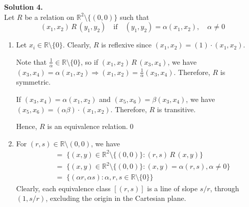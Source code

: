\documentclass[10pt]{article}
\begin{document}
        \textbf{Solution 4.}\\
        Let $R$ be a relation on $\mathbb{R}^2\setminus\{(0,0)\}$ such that
        \[(x_1, x_2)\,R\,(y_1, y_2) \quad\text{if}\quad (y_1, y_2) = \alpha(x_1, x_2), \quad\alpha\neq 0\]
        \begin{enumerate}
                \item Let $x_i \in \mathbb{R}\setminus\{0\}$.
                Clearly, $R$ is reflexive since $(x_1, x_2) = (1)\cdot (x_1, x_2)$.

                Note that $\frac{1}{\alpha} \in \mathbb{R}\setminus\{0\}$, so if $(x_1, x_2)\,R\,(x_3, x_4)$, we have
                $(x_3, x_4)=\alpha(x_1, x_2) \Rightarrow (x_1, x_2) = \frac{1}{\alpha}(x_3, x_4)$. Therefore, $R$ is symmetric.
                
                If $(x_3, x_4) = \alpha(x_1, x_2)$ and $(x_5, x_6) = \beta(x_3, x_4)$, we have $(x_5, x_6) = (\alpha\beta)\cdot (x_1, x_2)$.
                Therefore, $R$ is transitive.

                Hence, $R$ is an equivalence relation.\qed
                
                \item For $(r, s) \in \mathbb{R}\setminus(0,0)$, we have
                \begin{align*}
                        [(r, s)] \;&=\; \{(x, y) \in \mathbb{R}^2\setminus\{(0, 0)\} : (r, s)\,R\,(x, y)\} \\
                                \;&=\; \{(x, y) \in \mathbb{R}^2\setminus\{(0, 0)\} : (x, y) = \alpha(r, s), \alpha \neq 0\} \\
                                \;&=\; \{(\alpha r, \alpha s) : \alpha, r, s \in \mathbb{R}\setminus\{0\}\}
                \end{align*}
                Clearly, each equivalence class $[(r, s)]$ is a line of slope $s/r$, through $(1, s/r)$, excluding the origin in the
                Cartesian plane.\\

                \begin{center}
                \end{center}
 
        \end{enumerate}
\end{document}
